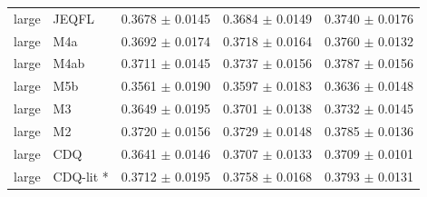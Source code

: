 \begin{table}[t]
\begin{tabular}{lllll}
large & JEQFL & 0.3678 $\pm$ 0.0145 & 0.3684 $\pm$ 0.0149 & 0.3740 $\pm$ 0.0176 \\
large & M4a & 0.3692 $\pm$ 0.0174 & 0.3718 $\pm$ 0.0164 & 0.3760 $\pm$ 0.0132 \\
large & M4ab & 0.3711 $\pm$ 0.0145 & 0.3737 $\pm$ 0.0156 & 0.3787 $\pm$ 0.0156 \\
large & M5b & 0.3561 $\pm$ 0.0190 & 0.3597 $\pm$ 0.0183 & 0.3636 $\pm$ 0.0148 \\
large & M3 & 0.3649 $\pm$ 0.0195 & 0.3701 $\pm$ 0.0138 & 0.3732 $\pm$ 0.0145 \\
large & M2 & 0.3720 $\pm$ 0.0156 & 0.3729 $\pm$ 0.0148 & 0.3785 $\pm$ 0.0136 \\
large & CDQ & 0.3641 $\pm$ 0.0146 & 0.3707 $\pm$ 0.0133 & 0.3709 $\pm$ 0.0101 \\
large & CDQ-lit * & 0.3712 $\pm$ 0.0195 & 0.3758 $\pm$ 0.0168 & 0.3793 $\pm$ 0.0131 \\
\bottomrule
\end{tabular}
\end{table}